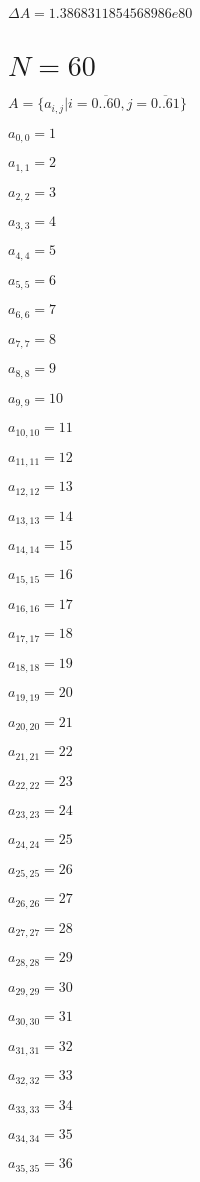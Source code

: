 \documentclass[a4paper,12pt]{article}
\begin{document}
$\Delta A = 1.3868311854568986e80$



\section{ $N = 60$ }
$A = \{ a _{ i, j } | i = \overline { 0..60 }, j = \overline { 0..61 } \}$

$a _{ 0, 0 } = 1$

$a _{ 1, 1 } = 2$

$a _{ 2, 2 } = 3$

$a _{ 3, 3 } = 4$

$a _{ 4, 4 } = 5$

$a _{ 5, 5 } = 6$

$a _{ 6, 6 } = 7$

$a _{ 7, 7 } = 8$

$a _{ 8, 8 } = 9$

$a _{ 9, 9 } = 10$

$a _{ 10, 10 } = 11$

$a _{ 11, 11 } = 12$

$a _{ 12, 12 } = 13$

$a _{ 13, 13 } = 14$

$a _{ 14, 14 } = 15$

$a _{ 15, 15 } = 16$

$a _{ 16, 16 } = 17$

$a _{ 17, 17 } = 18$

$a _{ 18, 18 } = 19$

$a _{ 19, 19 } = 20$

$a _{ 20, 20 } = 21$

$a _{ 21, 21 } = 22$

$a _{ 22, 22 } = 23$

$a _{ 23, 23 } = 24$

$a _{ 24, 24 } = 25$

$a _{ 25, 25 } = 26$

$a _{ 26, 26 } = 27$

$a _{ 27, 27 } = 28$

$a _{ 28, 28 } = 29$

$a _{ 29, 29 } = 30$

$a _{ 30, 30 } = 31$

$a _{ 31, 31 } = 32$

$a _{ 32, 32 } = 33$

$a _{ 33, 33 } = 34$

$a _{ 34, 34 } = 35$

$a _{ 35, 35 } = 36$
\end{document}
